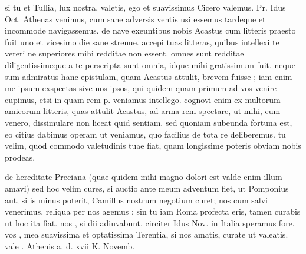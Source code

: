 


 si tu et Tullia, lux nostra, valetis, ego et suavissimus Cicero valemus. Pr. Idus Oct. Athenas venimus, cum sane adversis ventis usi essemus tardeque et incommode navigassemus. de nave exeuntibus nobis Acastus cum litteris praesto fuit uno et vicesimo die sane strenue. accepi tuas litteras, quibus intellexi te vereri ne superiores mihi redditae non essent. omnes sunt redditae diligentissimeque a te perscripta sunt omnia, idque mihi gratissimum fuit. neque sum admiratus hanc epistulam, quam Acastus attulit, brevem fuisse ; iam enim me ipsum exspectas sive nos ipsos, qui quidem quam primum ad vos venire cupimus, etsi in quam rem p. veniamus intellego. cognovi enim ex multorum amicorum litteris, quas attulit Acastus, ad arma rem spectare, ut mihi, cum venero, dissimulare non liceat quid sentiam. sed quoniam subeunda fortuna est, eo citius dabimus operam ut veniamus, quo facilius de tota re deliberemus. tu velim, quod commodo valetudinis tuae fiat, quam longissime poteris obviam nobis prodeas.

 de hereditate Preciana (quae quidem mihi magno dolori est valde enim illum amavi) sed hoc velim cures, si auctio ante meum adventum fiet, ut Pomponius aut, si is minus poterit, Camillus nostrum negotium curet; nos cum salvi venerimus, reliqua per nos agemus ; sin tu iam Roma profecta eris, tamen curabis ut hoc ita fiat. nos , si dii adiuvabunt, circiter Idus Nov. in Italia speramus fore. vos , mea suavissima et optatissima Terentia, si nos amatis, curate ut valeatis. vale . Athenis a. d. xvii K. Novemb.
